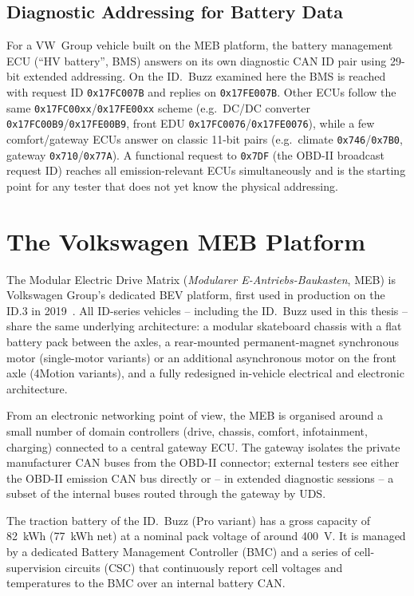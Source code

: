 \documentclass[11pt,a4paper,oneside,parskip=half]{scrreprt}
\providecommand{\hex}{}\renewcommand{\hex}[1]{\texttt{0x#1}}
\begin{document}
\subsection{Diagnostic Addressing for Battery Data}
\label{ssec:diag_addr}
For a VW~Group vehicle built on the MEB platform, the battery management ECU (``HV battery'', BMS) answers on its own diagnostic CAN ID pair using 29-bit extended addressing. On the ID.~Buzz examined here the BMS is reached with request ID \hex{17FC007B} and replies on \hex{17FE007B}. Other ECUs follow the same \hex{17FC00xx}/\hex{17FE00xx} scheme (e.g.\ DC/DC converter \hex{17FC00B9}/\hex{17FE00B9}, front EDU \hex{17FC0076}/\hex{17FE0076}), while a few comfort/gateway ECUs answer on classic 11-bit pairs (e.g.\ climate \hex{746}/\hex{7B0}, gateway \hex{710}/\hex{77A}). A functional request to \hex{7DF} (the OBD-II broadcast request ID) reaches all emission-relevant ECUs simultaneously and is the starting point for any tester that does not yet know the physical addressing.

\section{The Volkswagen MEB Platform}
The Modular Electric Drive Matrix (\textit{Modularer E-Antriebs-Baukasten}, MEB) is Volkswagen Group's dedicated BEV platform, first used in production on the ID.3 in 2019~\cite{vw_meb_platform,schaal2020meb}. All ID-series vehicles -- including the ID.~Buzz used in this thesis -- share the same underlying architecture: a modular skateboard chassis with a flat battery pack between the axles, a rear-mounted permanent-magnet synchronous motor (single-motor variants) or an additional asynchronous motor on the front axle (4Motion variants), and a fully redesigned in-vehicle electrical and electronic architecture.

From an electronic networking point of view, the MEB is organised around a small number of domain controllers (drive, chassis, comfort, infotainment, charging) connected to a central gateway ECU. The gateway isolates the private manufacturer CAN buses from the OBD-II connector; external testers see either the OBD-II emission CAN bus directly or -- in extended diagnostic sessions -- a subset of the internal buses routed through the gateway by UDS.

The traction battery of the ID.~Buzz (Pro variant) has a gross capacity of 82~kWh (77~kWh net) at a nominal pack voltage of around 400~V. It is managed by a dedicated Battery Management Controller (BMC) and a series of cell-supervision circuits (CSC) that continuously report cell voltages and temperatures to the BMC over an internal battery CAN.
\end{document}
